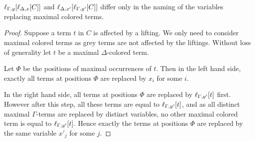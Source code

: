 \begin{lemma}

	$ \ell_{\Gamma,y}[ \ell_{\Delta,x}[ C]  ]$ and 
	$ \ell_{\Delta,x'}[ \ell_{\Gamma,y'}[ C]  ]$
	differ only in the naming of the variables replacing maximal colored terms.
	\label{lemma:naming_of_colored_variables}

\end{lemma}
\begin{proof}
	Suppose a term $t$ in $C$ is affected by a lifting.
	We only need to consider maximal colored terms as grey terms are not affected by the liftings.
	Without loss of generality let $t$ be a maximal $\Delta$-colored term.

	Let $\Phi$ be the positions of maximal occurrences of $t$.
	Then in the left hand side, exactly all terms at positions $\Phi$ are replaced by $x_i$ for some $i$.

	In the right hand side, all terms at positions $\Phi$ are replaced by $\ell_{\Gamma,y'}[t]$ first. 
	However after this step,
	all these terms are equal to $\ell_{\Gamma,y'}[t]$, and as all distinct maximal $\Gamma$-terms are replaced by distinct variables, no other maximal colored term is equal to $\ell_{\Gamma,y'}[t]$.
	Hence exactly the terms at positions $\Phi$ are replaced by the same variable $x'_j$ for some $j$.
\end{proof}

